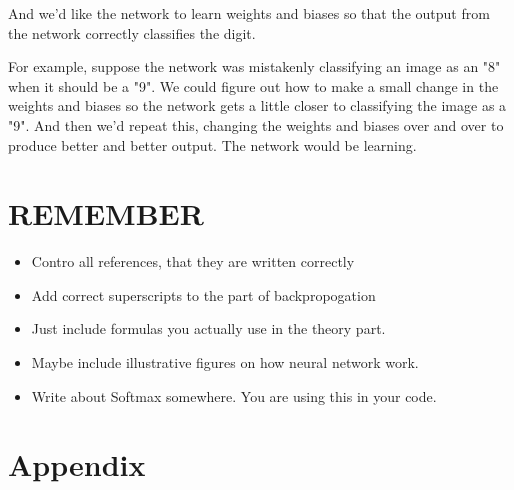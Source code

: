 \documentclass[a4paper,11pt,twocolumn]{article}
\begin{document}
And we'd like the network to learn weights and biases so that the output from the network correctly classifies the digit.

For example, suppose the network was mistakenly classifying an image as an "8" when it should be a "9". We could figure out how to make a small change in the weights and biases so the network gets a little closer to classifying the image as a "9". And then we'd repeat this, changing the weights and biases over and over to produce better and better output. The network would be learning.

\section{REMEMBER}
\begin{itemize}
\item Contro all references, that they are written correctly 
\item Add correct superscripts to the part of backpropogation
\item Just include formulas you actually use in the theory part.
\item Maybe include illustrative figures on how neural network work.
\item Write about Softmax somewhere. You are using this in your code. 
\end{itemize}

 
\section{Appendix}
\end{document}
